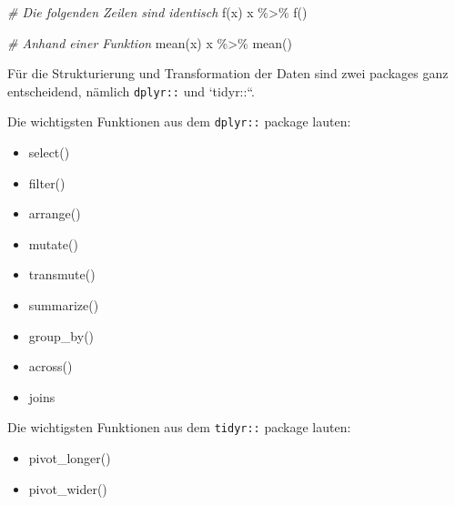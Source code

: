 \documentclass[
]{article}
\newenvironment{Shaded}{\begin{snugshade}}{\end{snugshade}}
\newcommand{\CommentTok}[1]{\textcolor[rgb]{0.56,0.35,0.01}{\textit{#1}}}
\newcommand{\FunctionTok}[1]{\textcolor[rgb]{0.00,0.00,0.00}{#1}}
\newcommand{\NormalTok}[1]{#1}
\newcommand{\SpecialCharTok}[1]{\textcolor[rgb]{0.00,0.00,0.00}{#1}}
\providecommand{\tightlist}{%
  \setlength{\itemsep}{0pt}\setlength{\parskip}{0pt}}
\begin{document}
\begin{Shaded}
\begin{Highlighting}[]
\CommentTok{\# Die folgenden Zeilen sind identisch}
\FunctionTok{f}\NormalTok{(x)}
\NormalTok{x }\SpecialCharTok{\%\textgreater{}\%} \FunctionTok{f}\NormalTok{()}

\CommentTok{\# Anhand einer Funktion}
\FunctionTok{mean}\NormalTok{(x)}
\NormalTok{x }\SpecialCharTok{\%\textgreater{}\%} \FunctionTok{mean}\NormalTok{()}
\end{Highlighting}
\end{Shaded}

Für die Strukturierung und Transformation der Daten sind zwei packages ganz entscheidend, nämlich \texttt{dplyr::} und `tidyr::``.

Die wichtigsten Funktionen aus dem \texttt{dplyr::} package lauten:

\begin{itemize}
\tightlist
\item
  select()
\item
  filter()
\item
  arrange()
\item
  mutate()
\item
  transmute()
\item
  summarize()
\item
  group\_by()
\item
  across()
\item
  joins
\end{itemize}

Die wichtigsten Funktionen aus dem \texttt{tidyr::} package lauten:

\begin{itemize}
\tightlist
\item
  pivot\_longer()
\item
  pivot\_wider()
\end{itemize}
\end{document}
